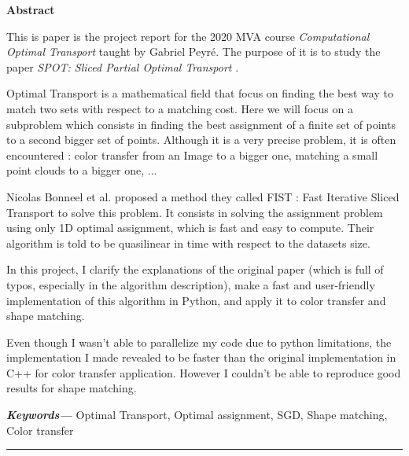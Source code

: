 \documentclass[a4paper,12pt]{article}
\providecommand{\keywords}[1]
{
  \textbf{\textit{Keywords---}} #1
}
\begin{document}

\tableofcontents
\thispagestyle{empty}
\setcounter{page}{0}

\newpage


\begin{center}
\textbf{Abstract}
\end{center}

This is paper is the project report for the 2020 MVA course \textit{Computational Optimal Transport} taught by Gabriel Peyré. The purpose of it is to study the paper \textit{SPOT: Sliced Partial Optimal Transport} \cite{BC19}.

Optimal Transport is a mathematical field that focus on finding the best way to match two sets with respect to a matching cost. Here we will focus on a subproblem which consists in finding the best assignment of a finite set of points to a second bigger set of points. Although it is a very precise problem, it is often encountered : color transfer from an Image to a bigger one, matching a small point clouds to a bigger one, ...

Nicolas Bonneel et al. proposed a method they called FIST : Fast Iterative Sliced Transport to solve this problem. It consists in solving the assignment problem using only 1D optimal assignment, which is fast and easy to compute. Their algorithm is told to be quasilinear in time with respect to the datasets size.

In this project, I clarify the explanations of the original paper (which is full of typos, especially in the algorithm description), make a fast and user-friendly implementation of this algorithm in Python, and apply it to color transfer and shape matching.

Even though I wasn't able to parallelize my code due to python limitations, the implementation I made revealed to be faster than the original implementation in C++ for color transfer application. However I couldn't be able to reproduce good results for shape matching.

\bigskip


\keywords{Optimal Transport, Optimal assignment, SGD, Shape matching, Color transfer}

\begin{center}
    \rule{4cm}{0.4pt}
\end{center}
\end{document}
